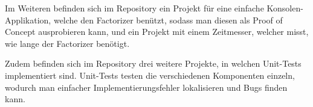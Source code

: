 Im Weiteren befinden sich im Repository ein Projekt für eine einfache Konsolen-Applikation, welche den \grqq Factorizer\grqq{} benützt, sodass man diesen als Proof of Concept ausprobieren kann, und ein Projekt mit einem Zeitmesser, welcher misst, wie lange der \grqq Factorizer \grqq{} benötigt.

Zudem befinden sich im Repository drei weitere Projekte, in welchen Unit-Tests implementiert sind. Unit-Tests testen die verschiedenen Komponenten einzeln, wodurch man einfacher Implementierungsfehler lokalisieren und Bugs finden kann.